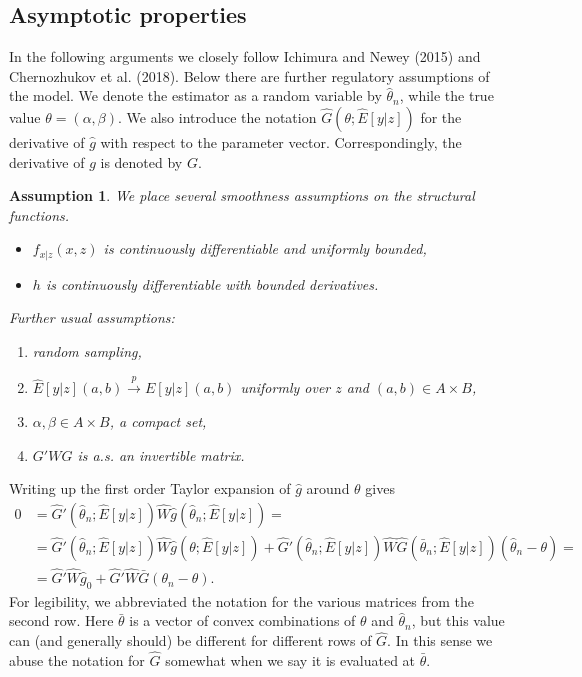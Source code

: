 \documentclass{article}
\newtheorem{assumption}{Assumption}
\theoremstyle{definition}
\theoremstyle{remark}
\begin{document}
\subsection{Asymptotic properties}
In the following arguments we closely follow Ichimura and Newey (2015) and Chernozhukov et al. (2018). Below there are further regulatory assumptions of the model. We denote the estimator as a random variable by $\hat{\theta}_n$, while the true value $\theta= (\alpha,\beta)$. We also introduce the notation $\hat{G}(\theta;\hat{E}[y|z])$ for the derivative of $\hat{g}$ with respect to the parameter vector. Correspondingly, the derivative of $g$ is denoted by $G$.

\begin{assumption}\label{ass_regulatory1}
	We place several smoothness assumptions on the structural functions.
	\begin{itemize}
		\item $f_{x|z}(x,z)$ is continuously differentiable and uniformly bounded,
		\item $h$ is continuously differentiable with bounded derivatives.
	\end{itemize}
	Further usual assumptions:
	\begin{enumerate}
		\item random sampling,
		\item $\hat{E}[y|z](a,b)\stackrel{p}{\rightarrow} E[y|z](a,b)$ uniformly over $z$ and $(a,b) \in A \times B$,
		\item $\alpha,\beta \in A \times B$, a compact set,
		\item $G'WG$ is a.s. an invertible matrix.
	\end{enumerate}
\end{assumption}

Writing up the first order Taylor expansion of $\hat{g}$ around $\theta$ gives
\begin{align}
    0&=\hat{G}'(\hat{\theta}_n;\hat{E}[y|z])\hat{W}\hat{g}(\hat{\theta}_n;\hat{E}[y|z])= \\ &=\hat{G}'(\hat{\theta}_n;\hat{E}[y|z])\hat{W}\hat{g}(\theta;\hat{E}[y|z])+ \hat{G}'(\hat{\theta}_n;\hat{E}[y|z])\hat{W}\hat{G}(\bar{\theta}_n;\hat{E}[y|z])(\hat{\theta}_n-\theta)= \nonumber \\
    &= \hat{G}'\hat{W}\hat{g}_0+ \hat{G}'\hat{W}\bar{G}(\theta_n-\theta). \nonumber
    \end{align}
For legibility, we abbreviated the notation for the various matrices from the second row. Here $\bar{\theta}$ is a vector of convex combinations of $\theta$ and $\hat{\theta}_n$, but this value can (and generally should) be different for different rows of $\hat{G}$. In this sense we abuse the notation for $\hat{G}$ somewhat when we say it is evaluated at $\bar{\theta}$.
\end{document}
